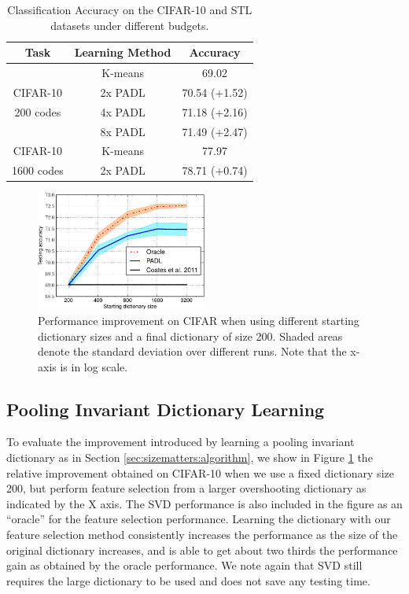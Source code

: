 \begin{table}
    \centering
    \begin{tabular}{ccc}
    \hline
    Task & Learning Method & Accuracy\\
    \hline
                & K-means   & 69.02 \\
    CIFAR-10    & 2x PADL    & 70.54 (+1.52) \\
    200 codes   & 4x PADL    & 71.18 (+2.16) \\
                & 8x PADL    & 71.49 (+2.47) \\
    \hline
    CIFAR-10    & K-means   & 77.97 \\
    1600 codes  & 2x PADL    & 78.71 (+0.74) \\
    \hline
  \end{tabular}
  \caption{Classification Accuracy on the CIFAR-10 and STL datasets under different budgets.}\label{tab:cifarstl}
\end{table}

\begin{figure}[t]
    \centering
    \includegraphics[width=0.5\textwidth]{figs/sizematters/cifar_improvement.pdf}
    \caption{Performance improvement on CIFAR when using different starting dictionary sizes and a final dictionary of size 200. Shaded areas denote the standard deviation over different runs. Note that the x-axis is in log scale.}\label{fig:relativeimprovement}
\end{figure}

\subsection{Pooling Invariant Dictionary Learning}\label{subsec:sizematters:exp:classification}
To evaluate the improvement introduced by learning a pooling invariant dictionary as in Section \ref{sec:sizematters:algorithm}, we show in Figure \ref{fig:relativeimprovement} the relative improvement obtained on CIFAR-10 when we use a fixed dictionary size 200, but perform feature selection from a larger overshooting dictionary as indicated by the X axis. The SVD performance is also included in the figure as an ``oracle'' for the feature selection performance. Learning the dictionary with our feature selection method consistently increases the performance as the size of the original dictionary increases, and is able to get about two thirds the performance gain as obtained by the oracle performance. We note again that SVD still requires the large dictionary to be used and does not save any testing time.

